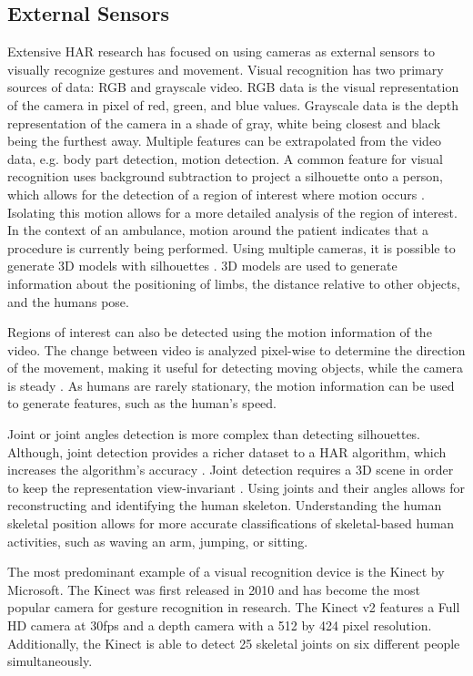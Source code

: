 \subsection{External Sensors}
Extensive \gls{HAR} research has focused on using cameras as external sensors to visually recognize gestures and movement. Visual recognition has two primary sources of data: RGB and grayscale video. RGB data is the visual representation of the camera in pixel of red, green, and blue values. Grayscale data is the depth representation of the camera in a shade of gray, white being closest and black being the furthest away. Multiple features can be extrapolated from the video data, e.g. body part detection, motion detection. A common feature for visual recognition uses background subtraction to project a silhouette onto a person, which allows for the detection of a region of interest where motion occurs \cite{Bobick2001}. Isolating this motion allows for a more detailed analysis of the region of interest. In the context of an ambulance, motion around the patient indicates that a procedure is currently being performed. Using multiple cameras, it is possible to generate 3D models with silhouettes \cite{Weinland2006}. 3D models are used to generate information about the positioning of limbs, the distance relative to other objects, and the humans pose.
\par Regions of interest can also be detected using the motion information of the video. The change between video is analyzed pixel-wise to determine the direction of the movement, making it useful for detecting moving objects, while the camera is steady \cite{Efros03}. As humans are rarely stationary, the motion information can be used to generate features, such as the human's speed.
\par Joint or joint angles detection is more complex than detecting silhouettes. Although, joint detection provides a richer dataset to a HAR algorithm, which increases the algorithm’s accuracy \cite{CGV-005}. Joint detection requires a 3D scene in order to keep the representation view-invariant \cite{Poppe2010}. Using joints and their angles allows for reconstructing and identifying the human skeleton. Understanding the human skeletal position allows for more accurate classifications of skeletal-based human activities, such as waving an arm, jumping, or sitting.
\par The most predominant example of a visual recognition device is the Kinect by Microsoft. The Kinect was first released in 2010 and has become the most popular camera for gesture recognition in research. The Kinect v2 features a Full HD camera at 30fps and a depth camera with a 512 by 424 pixel resolution. Additionally, the Kinect is able to detect 25 skeletal joints on six different people simultaneously.

